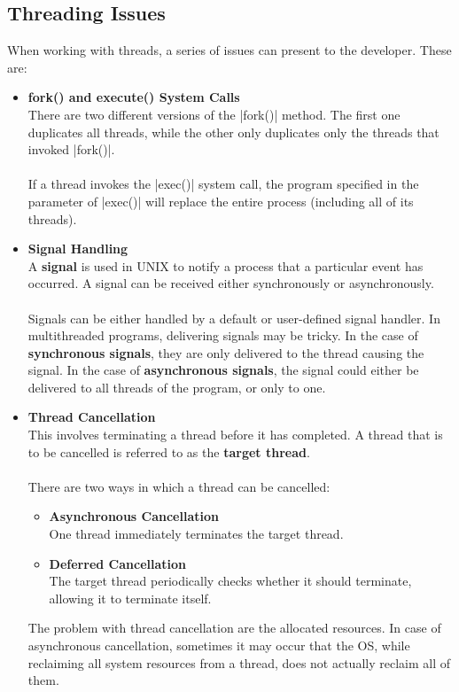 \documentclass{article}
\begin{document}
\subsection{Threading Issues}
When working with threads, a series of issues can present to the developer. These are:

\begin{itemize}
	\item \textbf{fork() and execute() System Calls}
	\vspace{.2cm} \\
	There are two different versions of the \cverb|fork()| method. The first one duplicates all threads, while the other only duplicates only the threads that invoked \cverb|fork()|. \\ \\
	If a thread invokes the \cverb|exec()| system call, the program specified in the parameter of \cverb|exec()| will replace the entire process (including all of its threads).
	
	\item \textbf{Signal Handling}
	\vspace{.2cm} \\
	A \textbf{signal} is used in UNIX to notify a process that a particular event has occurred. A signal can be received either synchronously or asynchronously. \\ \\
	Signals can be either handled  by a default or user-defined signal handler. In multithreaded programs, delivering signals may be tricky. In the case of \textbf{synchronous signals}, they are only delivered to the thread causing the signal. In the case of \textbf{asynchronous signals}, the signal could either be delivered to all threads of the program, or only to one.
	
	\item \textbf{Thread Cancellation}
	\vspace{.2cm} \\
	This involves terminating a thread before it has completed. A thread that is to be cancelled is referred to as the \textbf{target thread}. \\ \\
	There are two ways in which a thread can be cancelled:
	
	\begin{itemize}
		\item \textbf{Asynchronous Cancellation}
		\vspace{.2cm} \\
		One thread immediately terminates the target thread.
		
		\item \textbf{Deferred Cancellation}
		\vspace{.2cm} \\
		The target thread periodically checks whether it should terminate, allowing it to terminate itself.
	\end{itemize}
	The problem with thread cancellation are the allocated resources. In case of asynchronous cancellation, sometimes it may occur that the OS, while reclaiming all system resources from a thread, does not actually reclaim all of them.
\end{itemize}
\end{document}
